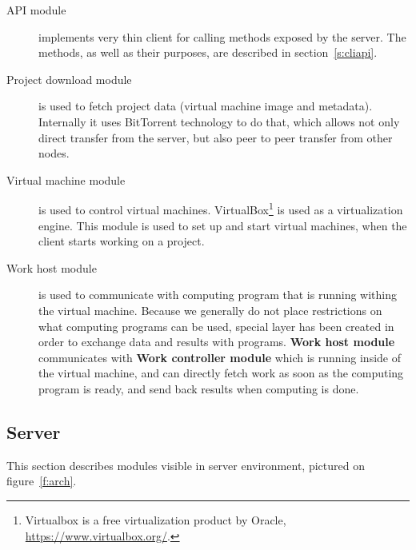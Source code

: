 \begin{description}

\item[API module] implements very thin client for calling methods exposed by the server. The methods, as well as their purposes, are described in section~\ref{s:cliapi}.

\item[Project download module] is used to fetch project data (virtual machine image and metadata). Internally it uses BitTorrent technology to do that, which allows not only direct transfer from the server, but also peer to peer transfer from other nodes.

\item[Virtual machine module] is used to control virtual machines. VirtualBox\footnote{Virtualbox is a free virtualization product by Oracle, \url{https://www.virtualbox.org/}.} is used as a virtualization engine. This module is used to set up and start virtual machines, when the client starts working on a project.

\item[Work host module] is used to communicate with computing program that is running withing the virtual machine. Because we generally do not place restrictions on what computing programs can be used, special layer has been created in order to exchange data and results with programs. \textbf{Work host module} communicates with \textbf{Work controller module} which is running inside of the virtual machine, and can directly fetch work as soon as the computing program is ready, and send back results when computing is done.

\end{description}

\subsection{Server}

This section describes modules visible in server environment, pictured on figure~\ref{f:arch}.

